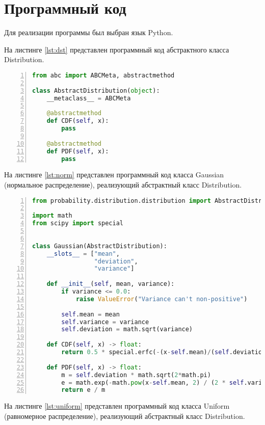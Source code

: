 \chapter{Программный код}

Для реализации программы был выбран язык Python. %

На листинге \ref{lst:dst} представлен программный код абстрактного класса Distribution.

\begin{lstlisting}[language=Python,
				   frame= tb,
				   numbers=left,
				   numberstyle=\footnotesize,
				   caption={Абстрактный класс Distribution},
				   label={lst:dst}]
from abc import ABCMeta, abstractmethod

class AbstractDistribution(object):
	__metaclass__ = ABCMeta

	@abstractmethod
	def CDF(self, x):
		pass

	@abstractmethod
	def PDF(self, x):
		pass
\end{lstlisting}

На листинге \ref{lst:norm} представлен программный код класса Gaussian (нормальное распределение), реализующий абстрактный класс Distribution.

\begin{lstlisting}[language=Python,
				   frame= tb,
				   numbers=left,
				   numberstyle=\footnotesize,
				   caption={Класс Gaussian},
				   label={lst:norm}]
from probability.distribution.distribution import AbstractDistribution

import math
from scipy import special


class Gaussian(AbstractDistribution):
	__slots__ = ["mean",
				 "deviation",
				 "variance"]

	def __init__(self, mean, variance):
		if variance <= 0.0:
			raise ValueError("Variance can't non-positive")

		self.mean = mean
		self.variance = variance
		self.deviation = math.sqrt(variance)

	def CDF(self, x) -> float:
		return 0.5 * special.erfc(-(x-self.mean)/(self.deviation*math.sqrt(2)))

	def PDF(self, x) -> float:
		m = self.deviation * math.sqrt(2*math.pi)
		e = math.exp(-math.pow(x-self.mean, 2) / (2 * self.variance))
		return e / m
\end{lstlisting}

На листинге \ref{lst:uniform} представлен программный код класса Uniform (равномерное распределение), реализующий абстрактный класс Distribution.

